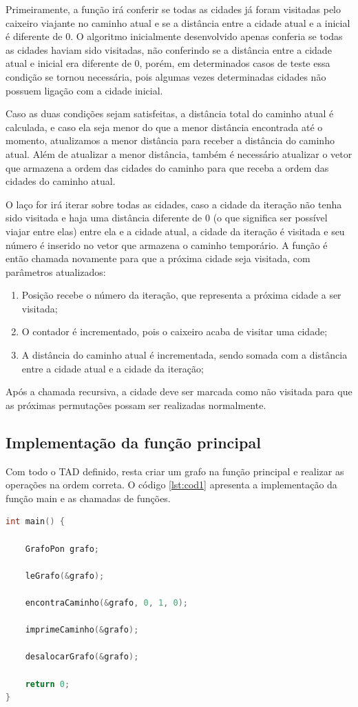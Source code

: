 \documentclass{article}
\begin{document}
 Primeiramente, a função irá conferir se todas as cidades já foram visitadas pelo caixeiro viajante no caminho atual e se a distância entre a cidade atual e a inicial é diferente de 0. O algoritmo inicialmente desenvolvido apenas conferia se todas as cidades haviam sido visitadas, não conferindo se a distância entre a cidade atual e inicial era diferente de 0, porém, em determinados casos de teste essa condição se tornou necessária, pois algumas vezes determinadas cidades não possuem ligação com a cidade inicial.

 Caso as duas condições sejam satisfeitas, a distância total do caminho atual é calculada, e caso ela seja menor do que a menor distância encontrada até o momento, atualizamos a menor distância para receber a distância do caminho atual. Além de atualizar a menor distância, também é necessário atualizar o vetor que armazena a ordem das cidades do caminho para que receba a ordem das cidades do caminho atual.

 O laço for irá iterar sobre todas as cidades, caso a cidade da iteração não tenha sido visitada e haja uma distância diferente de 0 (o que significa ser possível viajar entre elas) entre ela e a cidade atual, a cidade da iteração é visitada e seu número é inserido no vetor que armazena o caminho temporário. A função é então chamada novamente para que a próxima cidade seja visitada, com parâmetros atualizados:
 \begin{enumerate}
    \item Posição recebe o número da iteração, que representa a próxima cidade a ser visitada;
    \item O contador é incrementado, pois o caixeiro acaba de visitar uma cidade;
    \item A distância do caminho atual é incrementada, sendo somada com a distância entre a cidade atual e a cidade da iteração;
\end{enumerate}
Após a chamada recursiva, a cidade deve ser marcada como não visitada para que as próximas permutações possam ser realizadas normalmente.

\subsection{Implementação da função principal}
Com todo o TAD definido, resta criar um grafo na função principal e realizar as operações na ordem correta. O código \ref{lst:cod1} apresenta a implementação da função main e as chamadas de funções.
 \begin{lstlisting}[caption={Implementação da função main.},label={lst:cod1},language=C]
int main() {

    GrafoPon grafo;

    leGrafo(&grafo);

    encontraCaminho(&grafo, 0, 1, 0);

    imprimeCaminho(&grafo);

    desalocarGrafo(&grafo);
    
    return 0;
}
 \end{lstlisting}
\end{document}
